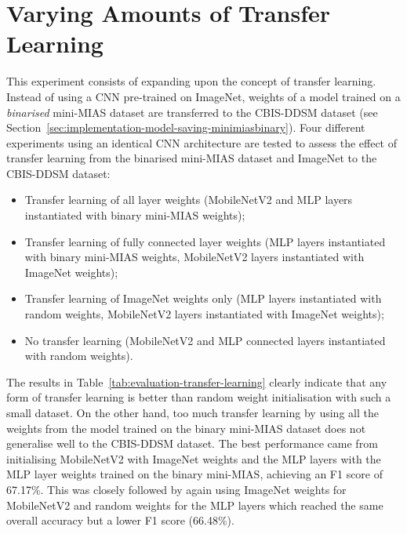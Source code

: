 
\section{Varying Amounts of Transfer Learning}
\label{sec:evaluation-transfer-learning}

This experiment consists of expanding upon the concept of transfer learning. Instead of using a CNN pre-trained on ImageNet, weights of a model trained on a \textit{binarised} mini-MIAS dataset are transferred to the CBIS-DDSM dataset (see Section~\ref{sec:implementation-model-saving-minimiasbinary}). Four different experiments using an identical CNN architecture are tested to assess the effect of transfer learning from the binarised mini-MIAS dataset and ImageNet to the CBIS-DDSM dataset:
\begin{itemize}
    \item Transfer learning of all layer weights (MobileNetV2 and MLP layers instantiated with binary mini-MIAS weights);
    \item Transfer learning of fully connected layer weights (MLP layers instantiated with binary mini-MIAS weights, MobileNetV2 layers instantiated with ImageNet weights);
    \item Transfer learning of ImageNet weights only (MLP layers instantiated with random weights, MobileNetV2 layers instantiated with ImageNet weights);
    \item No transfer learning (MobileNetV2 and MLP connected layers instantiated with random weights).
\end{itemize}



The results in Table~\ref{tab:evaluation-transfer-learning} clearly indicate that any form of transfer learning is better than random weight initialisation with such a small dataset. On the other hand, too much transfer learning by using all the weights from the model trained on the binary mini-MIAS dataset does not generalise well to the CBIS-DDSM dataset. The best performance came from initialising MobileNetV2 with ImageNet weights and the MLP layers with the MLP layer weights trained on the binary mini-MIAS, achieving an F1 score of 67.17\%. This was closely followed by again using ImageNet weights for MobileNetV2 and random weights for the MLP layers which reached the same overall accuracy but a lower F1 score (66.48\%).\\

